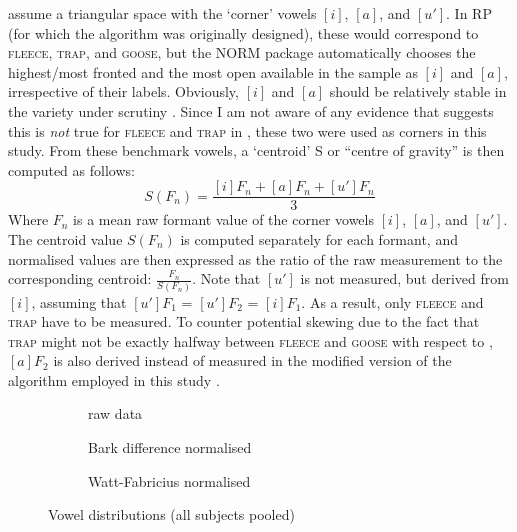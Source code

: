 \textcite{wattfabricius2002} assume a triangular  space with the `corner' vowels \([i]\), \([a]\), and \([u']\).
In RP (for which the algorithm was originally designed), these would correspond to \textsc{fleece}, \textsc{trap}, and \textsc{goose}, but
the NORM package automatically chooses the highest/most fronted and the most open  available in the sample as \([i]\) and \([a]\), irrespective of their labels.
Obviously, \([i]\) and \([a]\) should be relatively stable in the variety under scrutiny \parencite[cf.][163]{wattfabricius2002}.
Since I am not aware of any evidence that suggests this is \emph{not} true for \textsc{fleece} and \textsc{trap} in , these two were used as corners in this study.
From these benchmark vowels, a `centroid' S or ``centre of gravity'' \parencite[164]{wattfabricius2002} is then computed as follows:
\begin{equation}
	S(F_{n}) = \frac{[i]F_{n} + [a]F_{n} + [u']F_{n}}{3}
\end{equation}
Where \(F_{n}\) is a mean raw formant value of the corner vowels \([i]\), \([a]\), and \([u']\). The centroid value \(S(F_{n})\) is computed separately for each formant, and normalised values are then expressed as the ratio of the raw measurement to the corresponding centroid: \(\frac{F_{n}}{S(F_{n})}\).
Note that \([u']\) is not measured, but derived from \([i]\), assuming that \([u']F_{1}\) = \([u']F_{2}\) = \([i]F_{1}\).
As a result, only \textsc{fleece} and \textsc{trap} have to be measured.
To counter potential skewing due to the fact that \textsc{trap} might not be exactly halfway between \textsc{fleece} and \textsc{goose} with respect to , \([a]F_{2}\) is also derived instead of measured in the modified version of the algorithm employed in this study \parencites(cf.)()[420--421]{fabriciusetal2009}{kendallthomas2014}.

				\begin{figure}[h!]
					\centering
					\begin{subfigure}{.49\textwidth}
						\centering
						\resizebox{\linewidth}{!}{}
						\caption{raw data}
						\label{fig.plot.scatter.raw}
					\end{subfigure}
					
					\begin{subfigure}{.49\textwidth}
						\centering
						\resizebox{\linewidth}{!}{}
						\caption{Bark difference normalised}
						\label{fig.plot.scatter.bark}
					\end{subfigure}
					\begin{subfigure}{.49\textwidth}
						\centering
						\resizebox{\linewidth}{!}{}
						\caption{Watt-Fabricius normalised}
						\label{fig.plot.scatter.watt}
					\end{subfigure}
					
					\caption{Vowel distributions (all subjects pooled)}
					\label{fig.normcomp}
				\end{figure}

